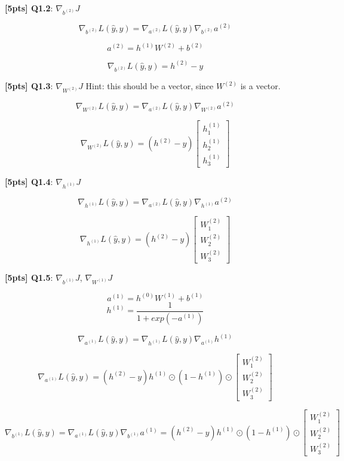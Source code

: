 \documentclass[11pt]{article}
\begin{document}
    \textbf{{[}5pts{]} Q1.2}: \(\nabla_{b^{(2)}}J\)

    \[  \nabla_{b^{(2)}}L(\hat y, y) = \nabla_{a^{(2)}}L(\hat y, y) \nabla_{b^{(2)}}a^{(2)}\]

\[ a^{(2)} = h^{(1)} W^{(2)} + b^{(2)}\]

\[ \nabla_{b^{(2)}}L(\hat y, y) =  h^{(2)} - y\]

    \textbf{{[}5pts{]} Q1.3}: \(\nabla_{W^{(2)}}J\) Hint: this should be a
vector, since \(W^{(2)}\) is a vector. 

    \[ \nabla_{W^{(2)}}L(\hat y, y) =  \nabla_{a^{(2)}}L(\hat y, y) \nabla_{W^{(2)}}a^{(2)} \]

\[
\nabla_{W^{(2)}}L(\hat y, y) =
(h^{(2)} - y)
 \begin{bmatrix}
h^{(1)}_{1} \\
h^{(1)}_{2} \\
h^{(1)}_{3}
\end{bmatrix} 
\]

    \textbf{{[}5pts{]} Q1.4}: \(\nabla_{h^{(1)}}J\)

    \[ \nabla_{h^{(1)}}L(\hat y, y) = \nabla_{a^{(2)}}L(\hat y, y) \nabla_{h^{(1)}}a^{(2)}\]

\[
\nabla_{h^{(1)}}L(\hat y, y) =
(h^{(2)} - y) 
 \begin{bmatrix}
W^{(2)}_{1} \\
W^{(2)}_{2} \\
W^{(2)}_{3}
\end{bmatrix} 
\]

    \textbf{{[}5pts{]} Q1.5}: \(\nabla_{b^{(1)}}J\), \(\nabla_{W^{(1)}}J\)

    \[ a^{(1)} = h^{(0)}  W^{(1)} + b^{(1)}\]
\[ h^{(1)} = \frac{1}{1+exp(-a^{(1)})}\]

\[ \nabla_{a^{(1)}}L(\hat y, y) = \nabla_{h^{(1)}}L(\hat y, y) \nabla_{a^{(1)}}h^{(1)} \]

\[ 
\nabla_{a^{(1)}}L(\hat y, y) =
(h^{(2)} - y) h^{(1)} \odot (1-h^{(1)}) \odot
 \begin{bmatrix}
W^{(2)}_{1} \\
W^{(2)}_{2} \\
W^{(2)}_{3}
\end{bmatrix}  \]

\[
\nabla_{b^{(1)}}L(\hat y, y) = \nabla_{a^{(1)}}L(\hat y, y) \nabla_{b^{(1)}}a^{(1)}
=
(h^{(2)} - y) h^{(1)} \odot (1-h^{(1)}) \odot
 \begin{bmatrix}
W^{(2)}_{1} \\
W^{(2)}_{2} \\
W^{(2)}_{3}
\end{bmatrix}
\]
\end{document}
